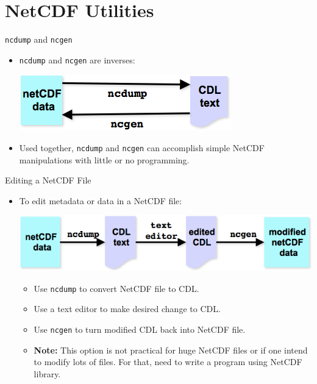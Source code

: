 \documentclass[compress,11pt,xcolor=svgnames,aspectratio=169]{beamer}
\begin{document}
\section{NetCDF Utilities}

\begin{frame}[fragile]{\texttt{ncdump} and \texttt{ncgen}}

\begin{itemize}
\setlength\itemsep{1cm}

  \item \texttt{ncdump} and \texttt{ncgen} are inverses:\\[0.4cm]

  \begin{center}
  \includegraphics[scale=0.5]{fig/nc-inv}
  \end{center}

  \item Used together, \texttt{ncdump} and \texttt{ncgen} can accomplish simple NetCDF manipulations with little or no programming.

\end{itemize}

\end{frame}

\begin{frame}[fragile]{Editing a NetCDF File}

\begin{itemize}
\setlength\itemsep{0.4cm}
  \item To edit metadata or data in a NetCDF file:\\[0.4cm]

\begin{center}
\includegraphics[scale=0.5]{fig/nc-edit}
\end{center}

  \begin{itemize}
  \setlength\itemsep{0.3cm}
    \item Use \texttt{ncdump} to convert NetCDF file to CDL.
    \item Use a text editor to make desired change to CDL.
    \item Use \texttt{ncgen} to turn modified CDL back into NetCDF file.
    \item \textbf{Note:} This option is not practical for huge NetCDF files or if one intend to modify lots of files. For that, need to write a program using NetCDF library.
  \end{itemize}

\end{itemize}

\end{frame}
\end{document}
